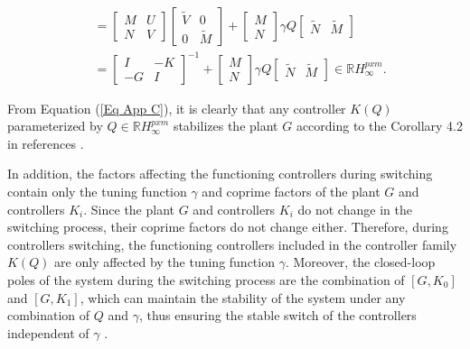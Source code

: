 \documentclass[journal]{IEEEtran}
\begin{document}
\begin{equation}
\begin{aligned}
     & =\left[\begin{array}{cc}M & U \\ N & V\end{array}\right]\left[\begin{array}{cc}\tilde{V} & 0 \\ 0 & \tilde{M}\end{array}\right]+\left[\begin{array}{c}M \\ N\end{array}\right] \gamma Q\left[\begin{array}{cc}\tilde{N} & \tilde{M}\end{array}\right]                       \\
     & =\left[\begin{array}{cc}
        I  & -K \\
        -G & I
      \end{array}\right]^{-1}+\left[\begin{array}{c}
        M \\
        N
      \end{array}\right] \gamma Q\left[\begin{array}{cc}
        \tilde{N} & \tilde{M}
      \end{array}\right] \in \mathbb{R} H_{\infty}^{p x m}.
  \end{aligned}
  \label{Eq App C}
\end{equation}

From Equation (\ref{Eq App C}), it is clearly that any controller $K(Q)$ parameterized by $Q \in \mathbb{R} H_{\infty}^{p x m} $ stabilizes the plant $G$ according to the Corollary 4.2 in references \citep{tay1998high,MAHTOUT202081}.

In addition, the factors affecting the functioning controllers during switching contain only the tuning function $\gamma$ and coprime factors of the plant $G$ and controllers $K_i$. Since the plant $G$ and controllers $K_i$ do not change in the switching process, their coprime factors do not change either. Therefore, during controllers switching, the functioning controllers included in the controller family $K(Q)$ are only affected by the tuning function $\gamma$. Moreover, the closed-loop poles of the system during the switching process are the combination of $[G, K_0]$ and $[G, K_1]$, which can maintain the stability of the system under any combination of $Q$ and $\gamma$, thus ensuring the stable switch of the controllers independent of $\gamma$ \citep{niemann1999architecture}.
\end{document}

